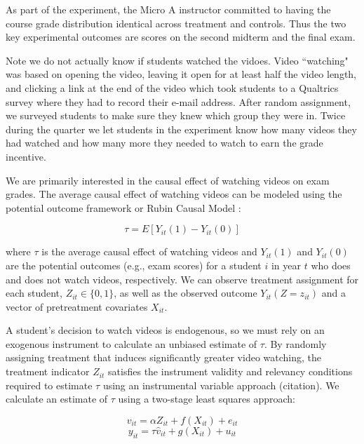 \documentclass[12pt]{article}
\begin{document}
As part of the experiment, the Micro A instructor committed to having the course grade distribution identical across treatment and controls. Thus the two key experimental outcomes are scores on the second midterm and the final exam. 

Note we do not actually know if students watched the vidoes.  Video ``watching" was based on opening the video, leaving it open for at least half the video length, and clicking a link at the end of the video which took students to a Qualtrics survey where they had to record their e-mail address. After random assignment, we surveyed students to make sure they knew which group they were in. Twice during the quarter we let students in the experiment know how many videos they had watched and how many more they needed to watch to earn the grade incentive.



We are primarily interested in the causal effect of watching videos on exam grades. The average causal effect of watching videos can be modeled using the potential outcome framework or Rubin Causal Model \parencite{ir2015}:

\begin{equation}
	\tau = E[Y_{it}(1) - Y_{it}(0)]
\end{equation}

where $\tau$ is the average causal effect of watching videos and $Y_{it}(1)$ and $Y_{it}(0)$ are the potential outcomes (e.g., exam scores) for a student $i$ in year $t$ who does and does not watch videos, respectively. We can observe treatment assignment for each student, $Z_{it} \in \{0,1\}$, as well as the observed outcome $Y_{it}(Z=z_{it})$ and a vector of pretreatment covariates $X_{it}$.

A student's decision to watch videos is endogenous, so we must rely on an exogenous instrument to calculate an unbiased estimate of $\tau$. By randomly assigning treatment that induces significantly greater video watching, the treatment indicator $Z_{it}$ satisfies the instrument validity and relevancy conditions required to estimate $\tau$ using an instrumental variable approach (citation). We calculate an estimate of $\tau$ using a two-stage least squares approach:

\begin{equation} \label{firststage_spec}
	v_{it} = \alpha Z_{it} + f(X_{it}) + e_{it}
\end{equation}
\begin{equation} \label{secondstage}
	y_{it} = \tau \hat{v}_{it} + g(X_{it}) + u_{it}
\end{equation}
\end{document}
